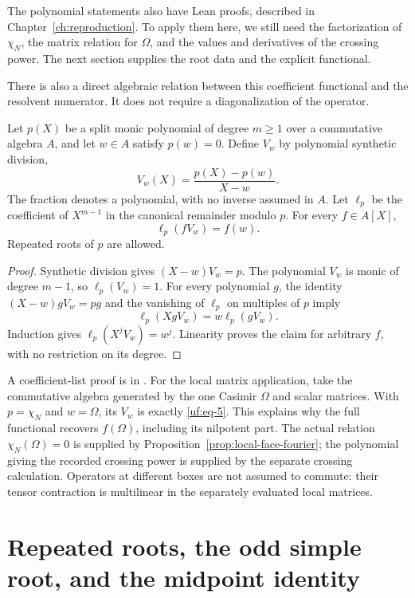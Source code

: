 The polynomial statements also have Lean proofs, described in
Chapter~\ref{ch:reproduction}. To apply them here, we still need the
factorization of \(\chi_N\), the matrix relation for \(\Omega\),
and the values and derivatives of the crossing power. The next
section supplies the root data and the explicit functional.

There is also a direct algebraic relation between this coefficient
functional and the resolvent numerator. It does not require a
diagonalization of the operator.

\begin{proposition}
\label{prop:resolvent-reproduction}
Let \(p(X)\) be a split monic polynomial of degree \(m\ge1\)
over a commutative algebra \(A\), and let \(w\in A\) satisfy
\(p(w)=0\). Define \(V_w\) by polynomial synthetic division,
\[
 V_w(X)=\frac{p(X)-p(w)}{X-w}.
\]
The fraction denotes a polynomial, with no inverse assumed in \(A\).
Let \(\ell_p\) be the coefficient of \(X^{m-1}\) in the
canonical remainder modulo \(p\). For every \(f\in A[X]\),
\[
                   \ell_p(fV_w)=f(w).
\]
Repeated roots of \(p\) are allowed.
\end{proposition}

\begin{proof}
Synthetic division gives \((X-w)V_w=p\). The polynomial \(V_w\)
is monic of degree \(m-1\), so \(\ell_p(V_w)=1\).
For every polynomial \(g\), the identity
\((X-w)gV_w=pg\) and the vanishing of \(\ell_p\) on multiples
of \(p\) imply
\[
               \ell_p(XgV_w)=w\ell_p(gV_w).
\]
Induction gives \(\ell_p(X^jV_w)=w^j\). Linearity proves the
claim for arbitrary \(f\), with no restriction on its degree.
\end{proof}

A coefficient-list proof is in
. For the
local matrix application, take the commutative algebra generated by
the one Casimir \(\Omega\) and scalar matrices. With
\(p=\chi_N\) and \(w=\Omega\), its \(V_w\) is exactly
\eqref{uf:eq-5}. This explains why the full functional recovers
\(f(\Omega)\), including its nilpotent part. The actual relation
\(\chi_N(\Omega)=0\) is supplied by
Proposition~\ref{prop:local-face-fourier}; the polynomial giving the
recorded crossing power is supplied by the separate crossing calculation.
Operators at different boxes
are not assumed to commute: their tensor contraction is multilinear
in the separately evaluated local matrices.

\section{Repeated roots, the odd simple root, and the midpoint
identity}\label{uf:sec-repeated-roots-the-odd-simple-root-and-the-midpoint-identity}

